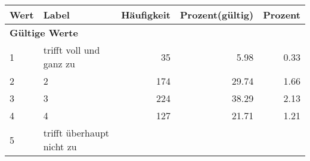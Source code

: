      \begin{longtable}{lXrrr}
     \toprule
     \textbf{Wert} & \textbf{Label} & \textbf{Häufigkeit} & \textbf{Prozent(gültig)} & \textbf{Prozent} \\
     \endhead
     \midrule
     \multicolumn{5}{l}{\textbf{Gültige Werte}}\\

     1 &
     \multicolumn{1}{X}{ trifft voll und ganz zu   } &


       \num{35} &
       \num[round-mode=places,round-precision=2]{5,98} &
         \num[round-mode=places,round-precision=2]{0,33} \\

     2 &
     \multicolumn{1}{X}{ 2   } &


       \num{174} &
       \num[round-mode=places,round-precision=2]{29,74} &
         \num[round-mode=places,round-precision=2]{1,66} \\

     3 &
     \multicolumn{1}{X}{ 3   } &


       \num{224} &
       \num[round-mode=places,round-precision=2]{38,29} &
         \num[round-mode=places,round-precision=2]{2,13} \\

     4 &
     \multicolumn{1}{X}{ 4   } &


       \num{127} &
       \num[round-mode=places,round-precision=2]{21,71} &
         \num[round-mode=places,round-precision=2]{1,21} \\

     5 &
     \multicolumn{1}{X}{ trifft überhaupt nicht zu   } &



\end{longtable}
